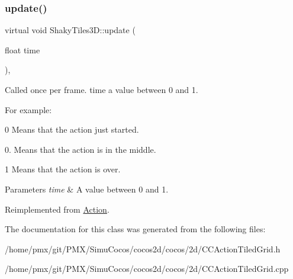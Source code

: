 \mbox{\label{classShakyTiles3D_aacc8c7fe8c72943ff116ba47e65712ad}} 
\subsubsection{\texorpdfstring{update()}{update()}\hspace{0.1cm}{\footnotesize\ttfamily [2/2]}}
{\footnotesize\ttfamily virtual void Shaky\+Tiles3\+D\+::update (\begin{DoxyParamCaption}\item[{float}]{time }\end{DoxyParamCaption})\hspace{0.3cm}{\ttfamily [override]}, {\ttfamily [virtual]}}

Called once per frame. time a value between 0 and 1.

For example\+:
\begin{DoxyItemize}
\item 0 Means that the action just started.
\item 0. Means that the action is in the middle.
\item 1 Means that the action is over.
\end{DoxyItemize}


\begin{DoxyParams}{Parameters}
{\em time} & A value between 0 and 1. \\
\hline
\end{DoxyParams}


Reimplemented from \hyperlink{classAction_a937e646e63915e33ad05ba149bfcf239}{Action}.



The documentation for this class was generated from the following files\+:\begin{DoxyCompactItemize}
\item 
/home/pmx/git/\+P\+M\+X/\+Simu\+Cocos/cocos2d/cocos/2d/C\+C\+Action\+Tiled\+Grid.\+h\item 
/home/pmx/git/\+P\+M\+X/\+Simu\+Cocos/cocos2d/cocos/2d/C\+C\+Action\+Tiled\+Grid.\+cpp\end{DoxyCompactItemize}
